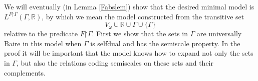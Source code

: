 \documentclass[fleqn, 11pt]{amsart}
\theoremstyle{plain}
\newtheorem{thm}{Theorem}[section]
\theoremstyle{definition}
\theoremstyle{remark}
\newcommand{\uB}{\mathrm{uB}}
\newcommand{\restrict}{\mathord{\restriction}}
\newcommand{\powerset}{\mathcal{P}}
\begin{document}
We will eventually (in Lemma \ref{Fabslem}) show that the desired minimal model is $L^{F \restrict \Gamma}(\Gamma, \mathbb{R})$,
by which we mean the model constructed from the transitive set \[V_\omega \cup \mathbb{R} \cup \Gamma \cup \{\Gamma\}\] relative to the predicate $F \restrict \Gamma$.
First we show that the sets in $\Gamma$ are universally Baire in this model when $\Gamma$ is selfdual and has the semiscale property. 
In the proof it will be important that the model knows how to expand not only the sets in $\Gamma$, but also the relations coding semiscales on these sets and their complements. 


% 
% 
\end{document}
